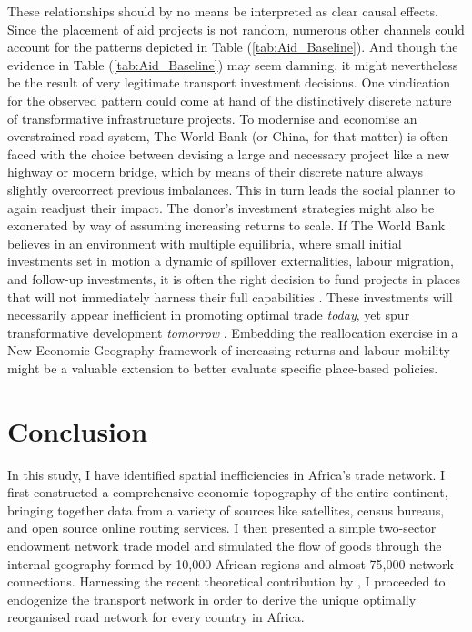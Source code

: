 \documentclass[11pt, oneside]{article}   	%
\let\oldref\ref
\renewcommand{\ref}[1]{(\oldref{#1})}
\begin{document}
These relationships should by no means be interpreted as clear causal effects. Since the placement of aid projects is not random, numerous other channels could account for the patterns depicted in Table \ref{tab:Aid_Baseline}. And though the evidence in Table \ref{tab:Aid_Baseline} may seem damning, it might nevertheless be the result of very legitimate transport investment decisions. One vindication for the observed pattern could come at hand of the distinctively discrete nature of transformative infrastructure projects. To modernise and economise an overstrained road system, The World Bank (or China, for that matter) is often faced with the choice between devising a large and necessary project like a new highway or modern bridge, which by means of their discrete nature always slightly overcorrect previous imbalances. This in turn leads the social planner to again readjust their impact. The donor's investment strategies might also be exonerated by way of assuming increasing returns to scale. If The World Bank believes in an environment with multiple equilibria, where small initial investments set in motion a dynamic of spillover externalities, labour migration, and follow-up investments, it is often the right decision to fund projects in places that will not immediately harness their full capabilities \citep{Krugman_HistoryExpectations_1991,Krugman_IncreasingReturnsEconomic_1991,Krugman_UrbanConcentrationRole_1996,Fujita_spatialeconomycities_1999,Duranton_PlaceBasedPoliciesDevelopment_2017}. These investments will necessarily appear inefficient in promoting optimal trade \emph{today}, yet spur transformative development \emph{tomorrow} \citep[see][]{Michaels_PlanningAheadBetter_2018}. Embedding the reallocation exercise in a New Economic Geography framework of increasing returns and labour mobility might be a valuable extension to better evaluate specific place-based policies.



\section{Conclusion}
\label{chap:conclusion}

In this study, I have identified spatial inefficiencies in Africa's trade network. I first constructed a comprehensive economic topography of the entire continent, bringing together data from a variety of sources like satellites, census bureaus, and open source online routing services. I then presented a simple two-sector endowment network trade model and simulated the flow of goods through the internal geography formed by 10,000 African regions and almost 75,000 network connections. Harnessing the recent theoretical contribution by \cite{Fajgelbaum_OptimalTransportNetworks_2017}, I proceeded to endogenize the transport network in order to derive the unique optimally reorganised road network for every country in Africa.
\end{document}
